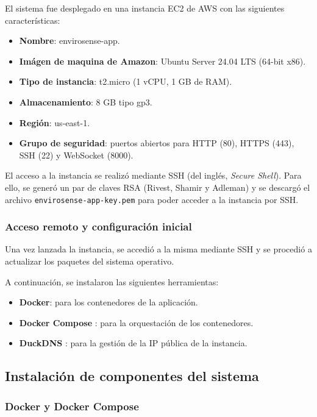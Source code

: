 El sistema fue desplegado en una instancia EC2 de AWS con las siguientes
características:

\begin{itemize}
    \item \textbf{Nombre}: envirosense-app.
    \item \textbf{Imágen de maquina de Amazon}: Ubuntu Server 24.04 LTS (64-bit x86).
    \item \textbf{Tipo de instancia}: t2.micro (1 vCPU, 1 GB de RAM).
    \item \textbf{Almacenamiento}: 8 GB tipo gp3.
    \item \textbf{Región}: us-east-1.
    \item \textbf{Grupo de seguridad}: puertos abiertos para HTTP (80), HTTPS (443),
          SSH (22) y WebSocket (8000).
\end{itemize}

El acceso a la instancia se realizó mediante SSH (del inglés, \textit{Secure
    Shell}). Para ello, se generó un par de claves RSA (Rivest, Shamir y Adleman) y
se descargó el archivo \texttt{envirosense-app-key.pem} para poder acceder a la
instancia por SSH.

\subsubsection{Acceso remoto y configuración inicial}

Una vez lanzada la instancia, se accedió a la misma mediante SSH y se procedió
a actualizar los paquetes del sistema operativo.

A continuación, se instalaron las siguientes herramientas:
\begin{itemize}
    \item \textbf{Docker}: para los contenedores de la aplicación.
    \item \textbf{Docker Compose} \cite{DockerCompose}: para la orquestación de los
          contenedores.
    \item \textbf{DuckDNS} \cite{DuckDNS}: para la gestión de la IP pública de la
          instancia.
\end{itemize}

\subsection{Instalación de componentes del sistema}

\subsubsection{Docker y Docker Compose}

